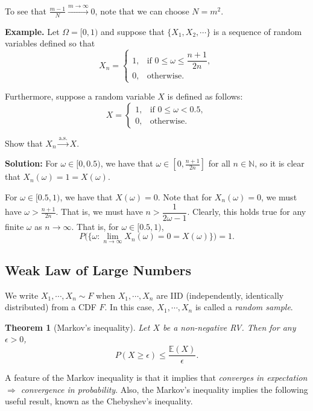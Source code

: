 \documentclass[twoside]{article}
\newcounter{lecnum}
\newtheorem{theorem}{Theorem}[lecnum]
\newcommand\E{\mathbb{E}}
\begin{document}
To see that $\frac{m-1}{N} \xrightarrow{m \to \infty} 0$, note that we can choose $N = m^2$.

{\bf Example. }Let $\Omega = [0,1)$ and suppose that $\{X_1, X_2, \cdots\}$ is a sequence of random variables defined so that
\[
X_n = 
\begin{cases}
1, & \text{if } 0 \le \omega \le \dfrac{n+1}{2n}, \\
0, & \text{otherwise.}
\end{cases}
\]

Furthermore, suppose a random variable $X$ is defined as follows:
\[
X = 
\begin{cases}
1, & \text{if } 0 \le \omega < 0.5, \\
0, & \text{otherwise.}
\end{cases}
\]

Show that $X_n \xrightarrow{\text{a.s.}} X$.

\medskip
\textbf{Solution:} 
For $\omega \in [0, 0.5)$, we have that $\omega \in [0, \tfrac{n+1}{2n}]$ for all $n \in \mathbb{N}$, so it is clear that $X_n(\omega) = 1 = X(\omega)$.

For $\omega \in [0.5, 1)$, we have that $X(\omega) = 0$. 
Note that for $X_n(\omega) = 0$, we must have $\omega > \tfrac{n+1}{2n}$. 
That is, we must have $n > \dfrac{1}{2\omega - 1}$. 
Clearly, this holds true for any finite $\omega$ as $n \to \infty$. 
That is, for $\omega \in [0.5, 1)$,
\[
P\big(\{\omega : \lim_{n \to \infty} X_n(\omega) = 0 = X(\omega)\}\big) = 1.
\]


\subsection{Weak Law of Large Numbers}


We write $X_1,\cdots,X_n\sim F$
when $X_1,\cdots,X_n$ are IID (independently, identically distributed) from a CDF $F $. 
In this case, $X_1,\cdots,X_n$ is called a \emph{random sample}.



\begin{theorem}[Markov's inequality]
Let $X$ be a non-negative RV. 
Then for any $\epsilon>0$,
$$
P(X\geq \epsilon)\leq \frac{\E(X)}{\epsilon}. 
$$
\end{theorem}

A feature of the Markov inequality is that 
it implies that \emph{converges in expectation $\Rightarrow$ convergence in probability}.
Also, the Markov's inequality implies the following useful result, known as the Chebyshev's inequality.
\end{document}
